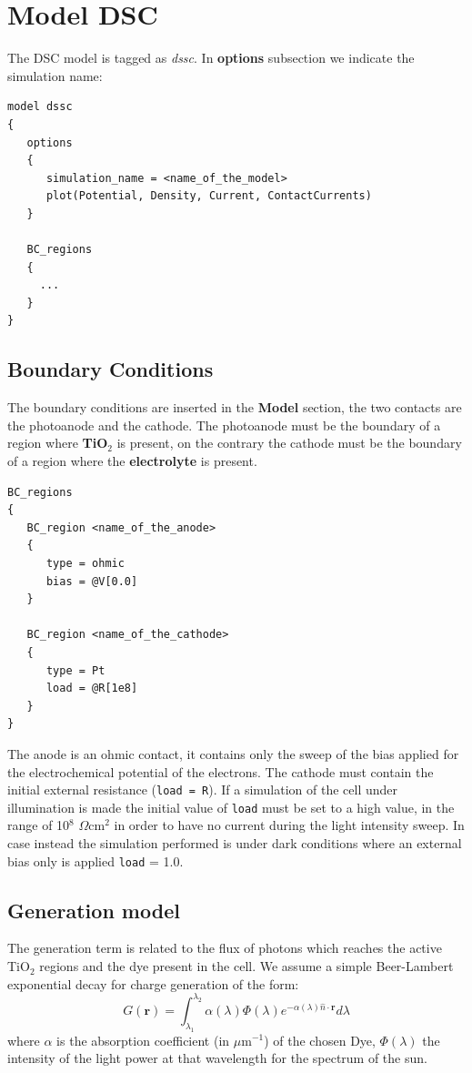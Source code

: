 \section{Model DSC}

The DSC model is tagged as \textit{dssc}. In \textbf{options}
subsection we indicate the simulation name:
\begin{verbatim}
model dssc
{
   options
   {
      simulation_name = <name_of_the_model>
      plot(Potential, Density, Current, ContactCurrents)
   }

   BC_regions
   {
     ...
   }
}
\end{verbatim}


\subsection{Boundary Conditions}

The boundary conditions are inserted in the {\bf Model} section,
the two contacts are the photoanode and the cathode. The
photoanode must be the boundary of a region where {\bf TiO$_2$} is
present, on the contrary the cathode must be the boundary of a
region where the {\bf electrolyte} is present.
\begin{verbatim}
BC_regions
{
   BC_region <name_of_the_anode>
   {
      type = ohmic
      bias = @V[0.0]
   }

   BC_region <name_of_the_cathode>
   {
      type = Pt
      load = @R[1e8]
   }
}
\end{verbatim}
The anode is an ohmic contact, it contains only the sweep of the
bias applied for the electrochemical potential of the electrons.
The cathode must contain the initial external resistance
(\texttt{load = R}). If a simulation of the cell under
illumination is made the initial value of \texttt{load} must be
set to a high value, in the range of 10$^{8}$ $\Omega$cm$^{2}$ in
order to have no current during the light intensity sweep. In case
instead the simulation performed is under dark conditions where an
external bias only is applied \texttt{load} = 1.0.


\subsection{Generation model}

The generation term is related to the flux of photons which
reaches the active TiO$_{2}$ regions and the dye present in the
cell. We assume a simple Beer-Lambert exponential decay for charge
generation of the form:
\begin{equation}\label{generation}
    G(\mathbf{r}) = \int^{\lambda_{2}}_{\lambda_{1}} \alpha(\lambda)
    \Phi (\lambda) e^{-\alpha(\lambda) \hat{n} \cdot \mathbf{r}}
    d\lambda
\end{equation}
where $\alpha$ is the absorption coefficient (in $\mu$m$^{-1}$) of
the chosen Dye, $\Phi(\lambda)$ the intensity of the light power
at that wavelength for the spectrum of the sun.

